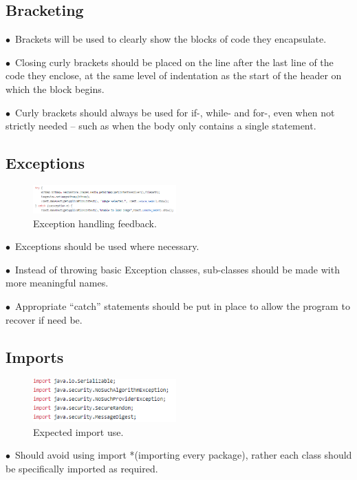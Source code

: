 \documentclass[english]{article}
\begin{document}
				\subsection{Bracketing}
$\bullet$\ Brackets will be used to clearly show the blocks of code they encapsulate.\par
$\bullet$\ Closing curly brackets should be placed on the line after the last line of the code they enclose, at the same level of indentation as the start of the header on which the block begins. \par
$\bullet$\ Curly brackets should always be used for if-, while- and for-, even when not strictly needed – such as when the body only contains a single statement.\par
\newpage
\subsection{Exceptions}
\begin{figure}
	\caption{Exception handling feedback.}
	\label{wrap-fig:3}
	\includegraphics[width=5.5cm]{images/exception.png}
\end{figure} 
$\bullet$\ Exceptions should be used where necessary.\par
$\bullet$\ Instead of throwing basic Exception classes, sub-classes should be made with more meaningful names.\par
$\bullet$\ Appropriate “catch” statements should be put in place to allow the program to recover if need be.\par




\subsection{Imports}
\begin{figure}
	\caption{Expected import use.}
	\label{wrap-fig:4}
	\includegraphics[width=5.5cm]{images/imports.png}
\end{figure} 
$\bullet$\ Should avoid using import *(importing every package), rather each class should be specifically imported as required.\par
\end{document}
